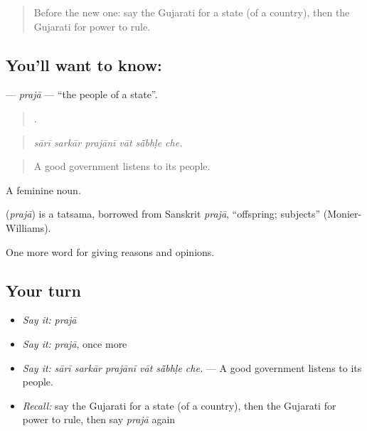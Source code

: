 \label{lesson:GU-C352-praja}



\begin{quote}
Before the new one: say the Gujarati for a state (of a country), then the Gujarati for power to rule.
\end{quote}

\subsection*{You'll want to know: }
\textbf{} — \emph{prajā} — \textquotedblleft{}the people of a state\textquotedblright{}.

\begin{quote}
     .
\end{quote}

\begin{quote}
\emph{sārī sarkār prajānī vāt sā̃bhḷe che.}
\end{quote}

\begin{quote}
A good government listens to its people.
\end{quote}

A feminine noun.

\begin{cousinweb}
\textbf{} (\emph{prajā}) is a tatsama, borrowed from Sanskrit \emph{prajā}, \textquotedblleft{}offspring; subjects\textquotedblright{} (Monier-Williams).
\end{cousinweb}

\begin{grammarlens}[title={What you've built}]
One more word for giving reasons and opinions.
\end{grammarlens}

\subsection*{Your turn}
\begin{itemize}
\raggedright
  \item \emph{Say it:} \emph{prajā}
  \item \emph{Say it:} \emph{prajā}, once more
  \item \emph{Say it:} \emph{sārī sarkār prajānī vāt sā̃bhḷe che.} — A good government listens to its people.
  \item \emph{Recall:} say the Gujarati for a state (of a country), then the Gujarati for power to rule, then say \emph{prajā} again
\end{itemize}

